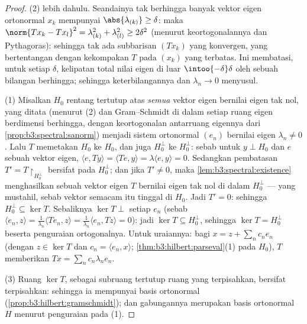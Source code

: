 \begin{proof}
(2) lebih dahulu. Seandainya tak berhingga banyak vektor eigen ortonormal $x_k$
mempunyai $\abs{\lambda_{(k)}} \geq \delta$: maka $\norm{Tx_k - Tx_l}^2 =
\lambda_{(k)}^2 + \lambda_{(l)}^2 \geq 2\delta^2$
(menurut keortogonalannya dan Pythagoras): sehingga tak ada subbarisan
$(Tx_k)$ yang konvergen, yang bertentangan dengan kekompakan $T$ pada
$(x_k)$ yang terbatas. Ini membatasi, untuk setiap $\delta$, kelipatan
total nilai eigen di luar
$\intoo{-\delta}\delta$ oleh sebuah bilangan berhingga; sehingga keterbilangannya dan $\lambda_n \to 0$
menyusul.

(1) Misalkan $H_0$ rentang tertutup atas \emph{semua} vektor eigen
bernilai eigen tak nol, yang ditata (menurut (2) dan
Gram--Schmidt di dalam setiap ruang eigen berdimensi berhingga, dengan
keortogonalan antarruang eigennya dari
\cref{prop:b3:spectral:sanorm}) menjadi sistem ortonormal
$(e_n)$ bernilai eigen $\lambda_n \neq 0$. Lalu $T$ memetakan $H_0$
ke $H_0$, dan juga $H_0^\perp$ ke $H_0^\perp$: sebab untuk $y
\perp H_0$ dan $e$ sebuah vektor eigen, $\langle e, Ty\rangle =
\langle Te, y\rangle = \lambda\langle e, y\rangle = 0$. Sedangkan
pembatasan $T' = T\restriction_{H_0^\perp}$ bersifat  
pada  $H_0^\perp$; dan jika $T' \neq
0$, maka \cref{lem:b3:spectral:existence} menghasilkan sebuah vektor eigen
$T$ bernilai eigen tak nol di dalam $H_0^\perp$ ---
yang mustahil, sebab vektor semacam itu tinggal di $H_0$. Jadi $T' = 0$:
sehingga $H_0^\perp \subseteq \ker T$. Sebaliknya $\ker T \perp$ setiap
$e_n$ (sebab $\langle e_n, z\rangle = \frac1{\lambda_n}\langle
Te_n, z\rangle = \frac1{\lambda_n}\langle e_n, Tz\rangle =
0$): jadi $\ker T \subseteq H_0^\perp$, sehingga $\ker T =
H_0^\perp$ beserta penguraian ortogonalnya. Untuk uraiannya:
bagi $x = z + \sum_nc_ne_n$ (dengan $z \in \ker T$ dan $c_n = \langle
e_n, x\rangle$; \cref{thm:b3:hilbert:parseval}(1) pada $H_0$),
 $T$ memberikan $Tx = \sum_nc_n\lambda_ne_n$.

(3) Ruang $\ker T$, sebagai subruang tertutup ruang yang terpisahkan, bersifat
terpisahkan: sehingga ia mempunyai basis ortonormal
(\cref{prop:b3:hilbert:gramschmidt}); dan gabungannya merupakan
basis ortonormal $H$ menurut penguraian pada (1).
\end{proof}

